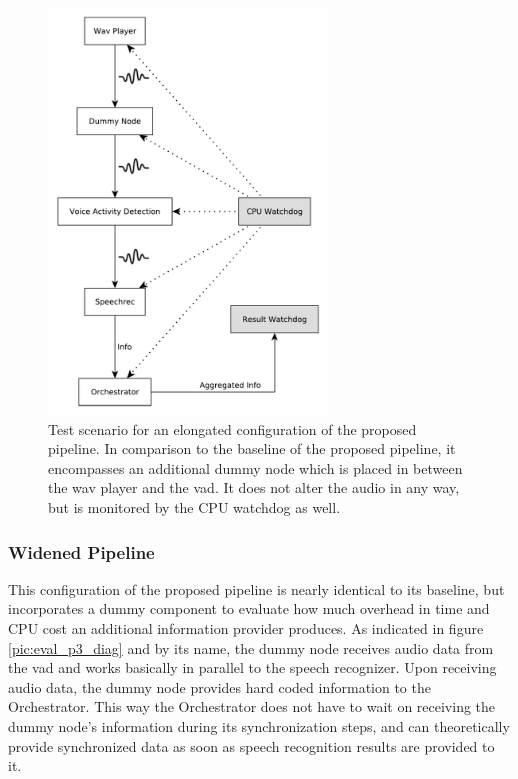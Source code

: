 \begin{figure}[]
	\centering
	\includegraphics[width=0.66\textwidth]{diagrams/eval_pipeline_4.pdf}
	\caption{Test scenario for an elongated configuration of the proposed pipeline.
		In comparison to the baseline of the proposed pipeline, it encompasses an additional dummy node which is placed in between the wav player and the \gls{vad}.
		It does not alter the audio in any way, but is monitored by the CPU watchdog as well.}
	\label{pic:eval_p4_diag}
\end{figure}

\subsubsection{Widened Pipeline}
This configuration of the proposed pipeline is nearly identical to its baseline, but incorporates a dummy component to evaluate how much overhead in time and CPU cost an additional information provider produces.
As indicated in figure \ref{pic:eval_p3_diag} and by its name, the dummy node receives audio data from the \gls{vad} and works basically in parallel to the speech recognizer.
Upon receiving audio data, the dummy node provides hard coded information to the Orchestrator.
This way the Orchestrator does not have to wait on receiving the dummy node's information during its synchronization steps, and can theoretically provide synchronized data as soon as speech recognition results are provided to it.

